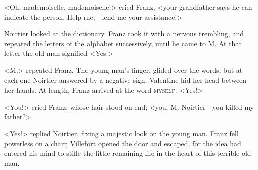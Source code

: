  <Oh, mademoiselle, mademoiselle!> cried Franz, <your grandfather says he can indicate the person. Help me,—lend me your assistance!> 

 Noirtier looked at the dictionary. Franz took it with a nervous trembling, and repeated the letters of the alphabet successively, until he came to M. At that letter the old man signified <Yes.> 

 <M,> repeated Franz. The young man's finger, glided over the words, but at each one Noirtier answered by a negative sign. Valentine hid her head between her hands. At length, Franz arrived at the word \textsc{myself}.  <Yes!> 

 <You!> cried Franz, whose hair stood on end; <you, M. Noirtier—you killed my father?> 

 <Yes!> replied Noirtier, fixing a majestic look on the young man. Franz fell powerless on a chair; Villefort opened the door and escaped, for the idea had entered his mind to stifle the little remaining life in the heart of this terrible old man.